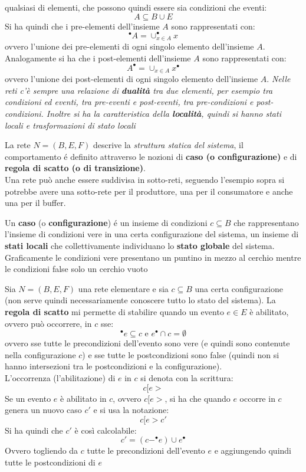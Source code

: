 \documentclass[a4paper,12pt, oneside]{book}
\begin{document}
\begin{definizione}
  qualsiasi di elementi, che possono quindi essere sia condizioni che eventi:
  \[A\subseteq B\cup E\]
  Si ha quindi che i pre-elementi dell'insieme $A$ sono rappresentati con:
  \[^\bullet A=\cup_{x\in A} ^\bullet x\]
  ovvero l'unione dei pre-elementi di ogni singolo elemento dell'insieme $A$.\\
  Analogamente si ha che i post-elementi dell'insieme $A$ sono rappresentati
  con: 
  \[A^\bullet=\cup_{x\in A} x^\bullet\]
  ovvero l'unione dei post-elementi di ogni singolo elemento dell'insieme $A$.
  \textit{Nelle reti c'è sempre una relazione di \textbf{dualità} tra due elementi, per
    esempio tra condizioni ed eventi, tra pre-eventi e post-eventi, tra
    pre-condizioni e post-condizioni. Inoltre si ha la caratteristica della
    \textbf{località}, quindi si hanno stati locali e trasformazioni di stato
    locali}
\end{definizione}
La rete $N=(B,E,F)$ descrive la \textit{struttura statica del sistema}, il
comportamento é definito attraverso le nozioni di \textbf{caso (o
  configurazione)} e di \textbf{regola di scatto (o di transizione)}.\\
Una rete può anche essere suddivisa in sotto-reti, seguendo l'esempio sopra si
potrebbe avere una sotto-rete per il produttore, una per il consumatore e anche
una per il buffer.\\
\begin{definizione}
  Un \textbf{caso} (o \textbf{configurazione}) é un insieme di condizioni
  $c\subseteq B$ che rappresentano l’insieme di condizioni vere in una certa
  configurazione del sistema, un insieme di \textbf{stati locali} che
  collettivamente individuano lo \textbf{stato globale} del sistema.\\
  Graficamente le condizioni vere presentano un puntino in mezzo al cerchio
  mentre le condizioni false solo un cerchio vuoto
\end{definizione}
\begin{definizione}
  Sia $N=(B,E,F)$ una rete elementare e sia $c\subseteq B$ una certa
  configurazione (non serve quindi necessariamente conoscere tutto lo stato del
  sistema). La \textbf{regola di scatto} mi permette di stabilire quando
  un evento $e\in E$ è abilitato, ovvero può occorrere, in $c$ sse:
  \[^\bullet e\subseteq c \mbox{ e } e^\bullet \cap c = \emptyset\]
  ovvero sse tutte le precondizioni dell'evento sono vere (e quindi sono
  contenute nella configurazione $c$) e sse tutte le postcondizioni sono false
  (quindi non si hanno intersezioni tra le postcondizioni e la
  configurazione). \\
  L'occorrenza (l'abilitazione) di $e$ in $c$ si denota con la scrittura:
  \[c[e >\]
  Se un evento $e$ è abilitato in $c$, ovvero $c[e >$, si ha che quando $e$
  occorre in $c$ genera un nuovo caso $c'$ e si usa la notazione:
  \[c[e > c'\]
  Si ha quindi che $c'$ è così calcolabile:
  \[c'=(c-^\bullet e)\cup e^\bullet\]
  Ovvero togliendo da $c$ tutte le precondizioni dell'evento $e$ e aggiungendo
  quindi tutte le postcondizioni di $e$
\end{definizione}
\end{document}
